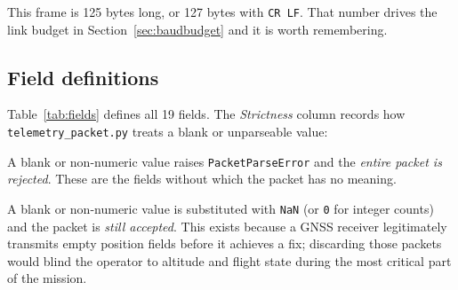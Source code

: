 \documentclass[11pt,a4paper]{article}
\newcommand{\file}[1]{\texttt{#1}}
\newcommand{\code}[1]{\texttt{#1}}
\begin{document}
This frame is 125 bytes long, or 127 bytes with \code{CR\,LF}. That number
drives the link budget in Section~\ref{sec:baudbudget} and it is worth
remembering.

\subsection{Field definitions}

Table~\ref{tab:fields} defines all 19 fields. The \emph{Strictness} column
records how \file{telemetry\_packet.py} treats a blank or unparseable value:

\begin{description}[leftmargin=18mm,style=nextline,font=\normalfont\bfseries]
  \item[Mandatory] A blank or non-numeric value raises
        \code{PacketParseError} and the \emph{entire packet is rejected}.
        These are the fields without which the packet has no meaning.
  \item[Optional] A blank or non-numeric value is substituted with
        \code{NaN} (or \code{0} for integer counts) and the packet is
        \emph{still accepted}. This exists because a GNSS receiver
        legitimately transmits empty position fields before it achieves a
        fix; discarding those packets would blind the operator to altitude
        and flight state during the most critical part of the mission.
\end{description}
\end{document}
